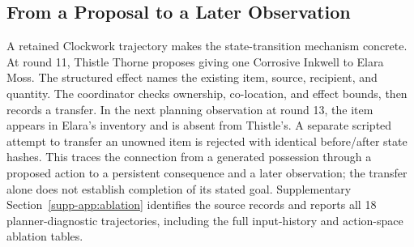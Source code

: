\subsection{From a Proposal to a Later Observation}
A retained Clockwork trajectory makes the state-transition mechanism concrete.
At round 11, Thistle Thorne proposes giving one Corrosive Inkwell to Elara
Moss. The structured effect names the existing item, source, recipient, and
quantity. The coordinator checks ownership, co-location, and effect bounds,
then records a transfer. In the next planning observation at round 13, the
item appears in Elara's inventory and is absent from Thistle's. A separate
scripted attempt to transfer an unowned item is rejected with identical
before/after state hashes. This traces the connection from a generated
possession through a proposed action to a persistent consequence and a later
observation; the transfer alone does not establish completion of its stated
goal. Supplementary Section~\ref{supp-app:ablation} identifies the source records
and reports all 18 planner-diagnostic trajectories, including the full
input-history and action-space ablation tables.
